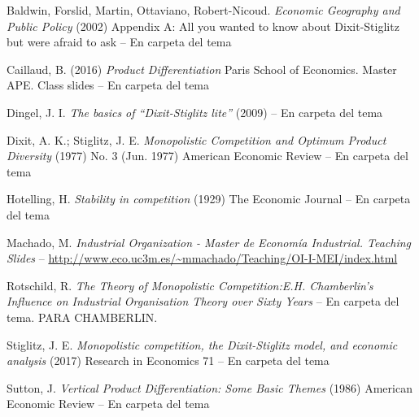 \documentclass{nuevotema}
\begin{document}
Baldwin, Forslid, Martin, Ottaviano, Robert-Nicoud. \textit{Economic Geography and Public Policy} (2002) Appendix A: All you wanted to know about Dixit-Stiglitz but were afraid to ask -- En carpeta del tema

Caillaud, B. (2016) \textit{Product Differentiation} Paris School of Economics. Master APE. Class slides -- En carpeta del tema

Dingel, J. I. \textit{The basics of ``Dixit-Stiglitz lite''} (2009) -- En carpeta del tema

Dixit, A. K.; Stiglitz, J. E. \textit{Monopolistic Competition and Optimum Product Diversity} (1977) No. 3 (Jun. 1977) American Economic Review -- En carpeta del tema

Hotelling, H. \textit{Stability in competition} (1929) The Economic Journal -- En carpeta del tema

Machado, M. \textit{Industrial Organization - Master de Economía Industrial. Teaching Slides} -- \url{http://www.eco.uc3m.es/~mmachado/Teaching/OI-I-MEI/index.html}

Rotschild, R. \textit{The Theory of Monopolistic Competition:E.H. Chamberlin's Influence on Industrial Organisation Theory over Sixty Years} -- En carpeta del tema. PARA CHAMBERLIN.

Stiglitz, J. E. \textit{Monopolistic competition, the Dixit-Stiglitz model, and economic analysis} (2017) Research in Economics 71 -- En carpeta del tema

Sutton, J. \textit{Vertical Product Differentiation: Some Basic Themes} (1986) American Economic Review -- En carpeta del tema
\end{document}
